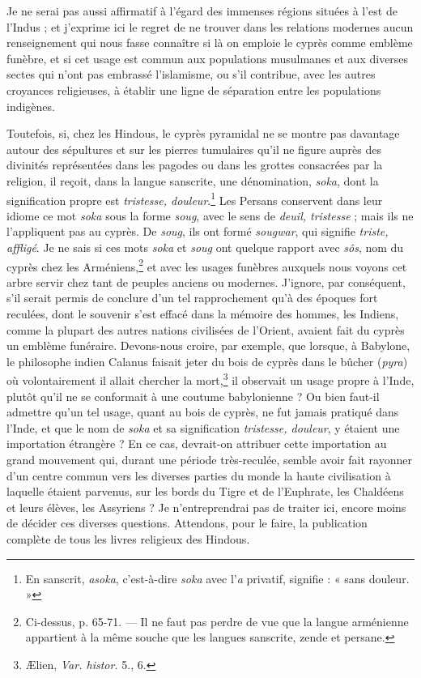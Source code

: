 \documentclass{article}
\begin{document}
Je ne serai pas aussi affirmatif à l'égard des immenses régions situées à l'est de l'Indus ; et j'exprime ici le regret de ne trouver dans les relations modernes aucun renseignement qui nous fasse connaître si là on emploie le cyprès comme emblème funèbre, et si cet usage est commun aux populations musulmanes et aux diverses sectes qui n'ont pas embrassé l'islamisme, ou s'il contribue, avec les autres croyances religieuses, à établir une ligne de séparation entre les populations indigènes.

Toutefois, si, chez les Hindous, le cyprès pyramidal ne se montre pas davantage autour des sépultures et sur les pierres tumulaires qu'il ne figure auprès des divinités représentées dans les pagodes ou dans les grottes consacrées par la religion, il reçoit, dans la langue sanscrite, une dénomination, \emph{soka}, dont la signification propre est \emph{tristesse, douleur}.\footnote{En sanscrit, \emph{asoka}, c'est-à-dire \emph{soka} avec l'\emph{a} privatif, signifie : « sans douleur. »} Les Persans conservent dans leur idiome ce mot \emph{soka} sous la forme \emph{soug}, avec le sens de \emph{deuil, tristesse} ; mais ils ne l'appliquent pas au cyprès. De \emph{soug}, ils ont formé \emph{sougwar}, qui signifie \emph{triste, affligé}. Je ne sais si ces mots \emph{soka} et \emph{soug} ont quelque rapport avec \emph{sôs}, nom du cyprès chez les Arméniens,\footnote{Ci-dessus, p. 65-71. --- Il ne faut pas perdre de vue que la langue arménienne appartient à la même souche que les langues sanscrite, zende et persane.} et avec les usages funèbres auxquels nous voyons cet arbre servir chez tant de peuples anciens ou modernes. J'ignore, par conséquent, s'il serait permis de conclure d'un tel rapprochement qu'à des époques fort reculées, dont le souvenir s'est effacé dans la mémoire des hommes, les Indiens, comme la plupart des autres nations civilisées de l'Orient, avaient fait du cyprès un emblème funéraire. Devons-nous croire, par exemple, que lorsque, à Babylone, le philosophe indien Calanus faisait jeter du bois de cyprès dans le bûcher (\emph{pyra}) où volontairement il allait chercher la mort,\footnote{Ælien, \emph{Var. histor.} 5., 6.} il observait un usage propre à l'Inde, plutôt qu'il ne se conformait à une coutume babylonienne ? Ou bien faut-il admettre qu'un tel usage, quant au bois de cyprès, ne fut jamais pratiqué dans l'Inde, et que le nom de \emph{soka} et sa signification \emph{tristesse, douleur}, y étaient une importation étrangère ? En ce cas, devrait-on attribuer cette importation au grand mouvement qui, durant une période très-reculée, semble avoir fait rayonner d'un centre commun vers les diverses parties du monde la haute civilisation à laquelle étaient parvenus, sur les bords du Tigre et de l'Euphrate, les Chaldéens et leurs élèves, les Assyriens ? Je n'entreprendrai pas de traiter ici, encore moins de décider ces diverses questions. Attendons, pour le faire, la publication complète de tous les livres religieux des Hindous.
\end{document}
